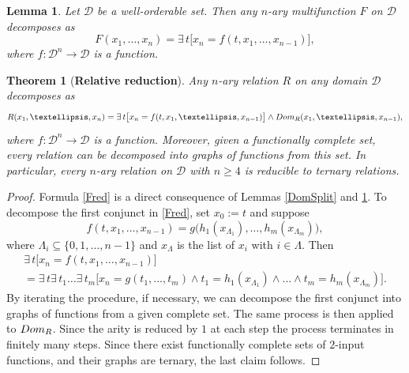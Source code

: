 \documentclass[10pt,a4paper]{amsart}
\newtheorem{lemma}{Lemma}
\newtheorem{theorem}{Theorem}
\def\D{\mathcal{D}}
\def\L{\Lambda}
\begin{document}
\begin{lemma}\label{MultSel} Let $\D$ be a well-orderable set. Then any $n$-ary multifunction $F$ on $\D$ decomposes as
\begin{equation}\label{MSel}
F(x_1,\dots,x_n)=\exists\,t\big[x_n=f(t,x_1,\dots,x_{n-1})\big],
\end{equation}
where $f:\D^{n}\to\D$ is a function.
\end{lemma}

\begin{theorem}[{\bf Relative reduction}]\label{FunRed} Any $n$-ary relation $R$ on any domain $\D$ decomposes as
\begin{equation}\label{Fred}
R(x_1,\dots,x_n)=\exists\,t\big[x_n=f(t,x_1,\dots,x_{n-1})\big]\land\textup{Dom}_R(x_1,\dots,x_{n-1}),
\end{equation}
where $f:\D^{n}\to\D$ is a function. Moreover, given a functionally complete set, every relation can be decomposed into graphs of functions from this set. In particular, every $n$-ary relation on $\D$ with $n\geq4$ is reducible to ternary relations.  
\end{theorem}

\begin{proof} Formula \eqref{Fred} is a direct consequence of Lemmas \ref{DomSplit} and \ref{MultSel}. To decompose the first conjunct in \eqref{Fred}, set $x_0:=t$ and suppose
$$
f(t,x_1,\dots,x_{n-1})=g\big(h_1(x_{\L_1}),\dots,
h_m(x_{\L_m})\big),
$$
where $\L_i\subseteq\{0,1,\dots,n-1\}$ and $x_{\L}$ is the list of $x_i$ with $i\in\L$. Then
\begin{multline}\label{Fun2Rel}
\exists\,t\big[x_n=f(t,x_1,\dots,x_{n-1})\big]\\ 
= \exists\,t\exists\,t_1\dots\exists\,t_m
\big[x_n=g(t_1,\dots,t_m)\land t_1=h_1(x_{\L_1})\land\dots\land t_m=h_m(x_{\L_m})\big].
\end{multline}
By iterating the procedure, if necessary, we can decompose the first conjunct into graphs of functions from a given complete set. The same process is then applied to $\textup{Dom}_R$. Since the arity is reduced by $1$ at each step the process terminates in finitely many steps. Since there exist functionally complete sets of $2$-input functions, and their graphs are ternary, the last claim follows.
\end{proof}
\end{document}
